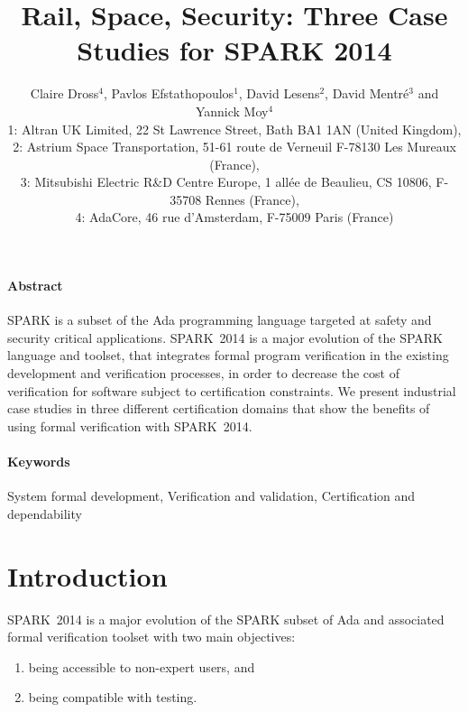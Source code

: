 \documentclass[10pt,a4paper,twocolumn]{article}
\newcommand{\newspark}{SPARK~2014\xspace}
\begin{document}
\title{Rail, Space, Security: Three Case Studies for SPARK 2014}

\author{%
\large Claire Dross$^4$, Pavlos Efstathopoulos$^1$, David Lesens$^2$, David Mentré$^3$ and Yannick Moy$^4$\\
\normalsize 1: Altran UK Limited, 22 St Lawrence Street, Bath BA1 1AN (United Kingdom),\\
\normalsize 2: Astrium Space Transportation, 51-61 route de Verneuil F-78130 Les Mureaux (France),\\
\normalsize 3: Mitsubishi Electric R\&D Centre Europe, 1 allée de
Beaulieu, CS 10806, F-35708 Rennes (France),\\
\normalsize 4: AdaCore, 46 rue d'Amsterdam, F-75009 Paris (France)}

\date{}

\maketitle

\paragraph{Abstract}
SPARK is a subset of the Ada programming language targeted at safety
and security critical applications. \newspark is a major evolution of
the SPARK language and toolset, that integrates formal program
verification in the existing development and verification processes,
in order to decrease the cost of verification for software subject to
certification constraints. We present industrial case studies in three
different certification domains that show the benefits of using formal
verification with \newspark.

\paragraph{Keywords}
System formal development, Verification and validation,
Certification and dependability

\section{Introduction}

\newspark is a major evolution of the SPARK subset of Ada and associated formal
verification toolset with two main objectives:
%
\begin{enumerate}
\item being accessible to non-expert users, and
\item being compatible with testing.
\end{enumerate}
\end{document}
